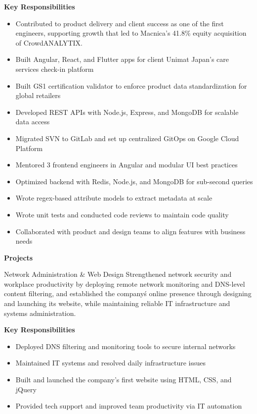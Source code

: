 \normalsize\textbf{Key Responsibilities}
\begin{itemize}[leftmargin=12pt,itemsep=0pt,topsep=4pt]
	\item \normalsize{Contributed to product delivery and client success as one of the first engineers, supporting growth that led to Macnica's 41.8\% equity acquisition of CrowdANALYTIX.}
	\item \normalsize{Built Angular, React, and Flutter apps for client Unimat Japan's care services check-in platform}
	\item \normalsize{Built GS1 certification validator to enforce product data standardization for global retailers}
	\item \normalsize{Developed REST APIs with Node.js, Express, and MongoDB for scalable data access}
	\item \normalsize{Migrated SVN to GitLab and set up centralized GitOps on Google Cloud Platform}
	\item \normalsize{Mentored 3 frontend engineers in Angular and modular UI best practices}
	\item \normalsize{Optimized backend with Redis, Node.js, and MongoDB for sub-second queries}
	\item \normalsize{Wrote regex-based attribute models to extract metadata at scale}
	\item \normalsize{Wrote unit tests and conducted code reviews to maintain code quality}
	\item \normalsize{Collaborated with product and design teams to align features with business needs}
\end{itemize}\vspace*{12pt}


\normalsize\textbf{Projects}\vspace{4pt}
\begin{sectionContainer}
	{Network Administration \& Web Design} {Strengthened network security and workplace productivity by deploying remote network monitoring and DNS-level content filtering, and established the company\'s online presence through designing and launching its website, while maintaining reliable IT infrastructure and systems administration.}
\end{sectionContainer}

\normalsize\textbf{Key Responsibilities}
\begin{itemize}[leftmargin=12pt,itemsep=0pt,topsep=4pt]
	\item \normalsize{Deployed DNS filtering and monitoring tools to secure internal networks}
	\item \normalsize{Maintained IT systems and resolved daily infrastructure issues}
	\item \normalsize{Built and launched the company's first website using HTML, CSS, and jQuery}
	\item \normalsize{Provided tech support and improved team productivity via IT automation}
\end{itemize}\vspace*{12pt}

\nopagebreak[4]